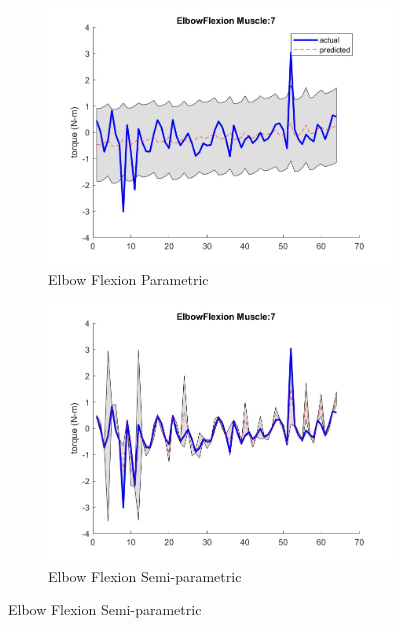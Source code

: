 \begin{figure}[htbp]
    \begin{subfigure}[b]{0.45\linewidth}
        \includegraphics[height=0.15\textheight]{Pictures/Results/GPR/ElbowFlexion_7Parametric.jpg}
        \caption{Elbow Flexion Parametric}
    \end{subfigure}
    \hfill
    \begin{subfigure}[b]{0.45\linewidth}
        \includegraphics[height=0.15\textheight]{Pictures/Results/GPR/ElbowFlexion_7Semiparametric.jpg}
        \caption{Elbow Flexion Semi-parametric}
    \end{subfigure}
    

\end{figure}
